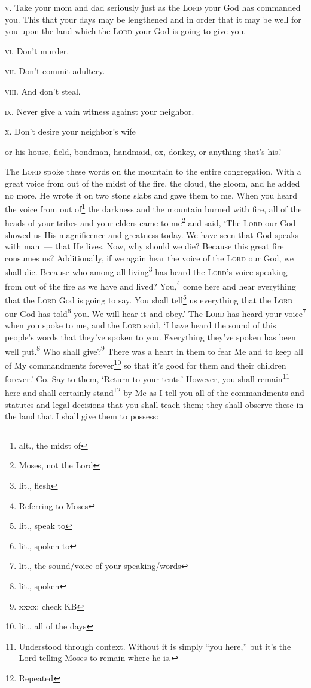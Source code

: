 \begin{inparaenum}
     \textsc{v.} Take your mom and dad seriously just as the \textsc{Lord} your God has commanded you. This that your days may be lengthened and in order that it may be well for you upon the land which the \textsc{Lord} your God is going to give you.%
    
     \textsc{vi.} Don't murder.%
    
     \textsc{vii.} Don't commit adultery.%
    
     \textsc{viii.} And don't steal.%
    
     \textsc{ix.} Never give a vain witness against your neighbor.%
    
     \textsc{x.} Don't desire your neighbor's wife
    
    or his house, field, bondman, handmaid, ox, donkey, or anything that's his.'%
    
     The \textsc{Lord} spoke these words on the mountain to the entire congregation. With a great voice from out of the midst of the fire, the cloud, the gloom, and he added no more. He wrote it on two stone slabs and gave them to me.%
     When you heard the voice from out of\footnote{alt., the midst of} the darkness and the mountain burned with fire, all of the heads of your tribes and your elders came to me\footnote{Moses, not the Lord}%
     and said, `The \textsc{Lord} our God showed us His magnificence and greatness today. We have seen that God speaks with man~--- that He lives.%
     Now, why should we die? Because this great fire consumes us? Additionally, if we again hear the voice of the \textsc{Lord} our God, we shall die.%
     Because who among all living\footnote{lit., flesh} has heard the \textsc{Lord}'s voice speaking from out of the fire as we have and lived?%
     You,\footnote{Referring to Moses} come here and hear everything that the \textsc{Lord} God is going to say. You shall tell\footnote{lit., speak to} us everything that the \textsc{Lord} our God has told\footnote{lit., spoken to} you. We will hear it and obey.'%
     The \textsc{Lord} has heard your voice\footnote{lit., the sound/voice of your speaking/words} when you spoke to me, and the \textsc{Lord} said, `I have heard the sound of this people's words that they've spoken to you. Everything they've spoken has been well put.\footnote{lit., spoken}%
     Who shall give?\footnote{xxxx: check KB} There was a heart in them to fear Me and to keep all of My commandments forever\footnote{lit., all of the days} so that it's good for them and their children forever.'%
     Go. Say to them, `Return to your tents.'%
     However, you shall remain\footnote{Understood through context. Without it is simply ``you here,'' but it's the Lord telling Moses to remain where he is.} here and shall certainly stand\footnote{Repeated} by Me as I tell you all of the commandments and statutes and legal decisions that you shall teach them; they shall observe these in the land that I shall give them to possess:%
\end{inparaenum}
